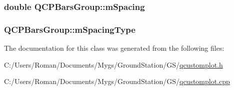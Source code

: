 \subsubsection[{m\+Spacing}]{\setlength{\rightskip}{0pt plus 5cm}double Q\+C\+P\+Bars\+Group\+::m\+Spacing\hspace{0.3cm}{\ttfamily [protected]}}\label{class_q_c_p_bars_group_a56471d7f548ca6141b7a5bf9629f7ece}
\hypertarget{class_q_c_p_bars_group_a6794ee1a9c81864d627bff6a4b2d64ec}{}
\subsubsection[{m\+Spacing\+Type}]{ Q\+C\+P\+Bars\+Group\+::m\+Spacing\+Type\hspace{0.3cm}{\ttfamily [protected]}}\label{class_q_c_p_bars_group_a6794ee1a9c81864d627bff6a4b2d64ec}


The documentation for this class was generated from the following files\+:\begin{DoxyCompactItemize}
\item 
C\+:/\+Users/\+Roman/\+Documents/\+Mygs/\+Ground\+Station/\+G\+S/\hyperlink{qcustomplot_8h}{qcustomplot.\+h}\item 
C\+:/\+Users/\+Roman/\+Documents/\+Mygs/\+Ground\+Station/\+G\+S/\hyperlink{qcustomplot_8cpp}{qcustomplot.\+cpp}\end{DoxyCompactItemize}
